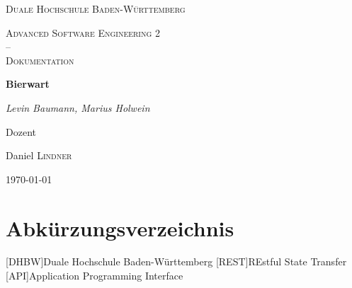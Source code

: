 \documentclass[12pt,a4paper,titlepage,ngerman,pdftex]{report}
\begin{document}
    \begin{titlepage}
        \centering
        {\scshape\LARGE Duale Hochschule Baden-Württemberg \par}
        \vspace{1cm}
        {\scshape\Large Advanced Software Engineering 2 \\--\\ Dokumentation\par}
        \vspace{1.5cm}
        {\huge\bfseries Bierwart\par}
        \vspace{2cm}
        {\Large\itshape Levin Baumann, Marius Holwein\par}
        \vfill
        Dozent\par
        Daniel \textsc{Lindner}

        \vfill

        {\large \today\par}
    \end{titlepage}

    \tableofcontents
    \listoffigures
    \lstlistoflistings

    \chapter*{Abkürzungsverzeichnis}
    \begin{acronym}[all]
        [DHBW]{Duale Hochschule Baden-Württemberg}
        [REST]{REstful State Transfer}
        [API]{Application Programming Interface}
    \end{acronym}
    \onehalfspacing
\end{document}
